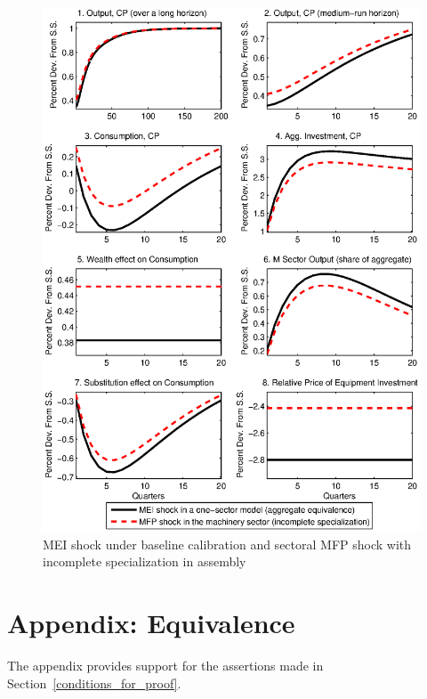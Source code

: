 \documentclass[12pt,fleqn]{article}
\begin{document}
\begin{figure}[tbp] \center
\caption{MEI shock under baseline calibration and sectoral MFP shock
with incomplete specialization in assembly} \label{figure_h1}
\includegraphics[scale=0.8]{figure_h1.ps}

\footnotesize \flushleft
{}
\end{figure}


\clearpage  \normalsize

\appendix

\section{Appendix: Equivalence} \label{appendix_proof}

The appendix provides support for the assertions made
in Section~\ref{conditions_for_proof}.
\end{document}
